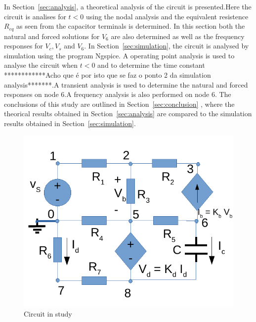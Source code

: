 In Section~\ref{sec:analysis}, a theoretical analysis of the circuit is
presented.Here the circuit is analises for $t<0$ using the nodal analysis and the equivalent resistence $R_{eq}$ as seen from the capacitor terminals is determined. In this section both the natural and forced solutions for $V_6$ are also determined as well as the frequency responses for $V_c, V_s$ and $V_6 $. In Section~\ref{sec:simulation}, the circuit is analysed by
simulation using the program Ngspice. A operating point analysis is used to analyse the circuit when $t<0$ and to determine the time constant ************Acho que é por isto que se faz o ponto 2 da simulation analysis*******.A transient analysis is used to determine the natural and forced responses on node 6.A frequency analysis is also performed on node 6. The conclusions of this study are outlined in
Section~\ref{sec:conclusion} , where the theorical results obtained in
Section~\ref{sec:analysis} are compared to the simulation results obtained in
Section~\ref{sec:simulation}.

\begin{figure}[h] \centering
\includegraphics[width=0.6\linewidth]{circuit_t2.pdf}
\caption{Circuit in study}
\label{fig:circuit_t2}
\end{figure}



